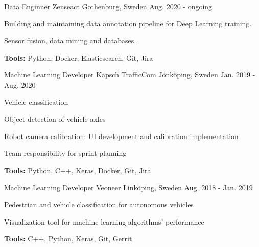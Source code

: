 

\begin{cventries}

  \cventry
    {Data Enginner} %
    {Zenseact} %
    {Gothenburg, Sweden} %
    {Aug. 2020 - ongoing} %
    {
      \begin{cvitems} %
        \item {Building and maintaining data annotation pipeline for Deep Learning training.}
        \item {Sensor fusion, data mining and databases.}
        \item {\textbf{Tools:} Python, Docker, Elasticsearch, Git, Jira}
      \end{cvitems}
    }

  \cventry
    {Machine Learning Developer} %
    {Kapsch TrafficCom} %
    {Jönköping, Sweden} %
    {Jan. 2019 - Aug. 2020} %
    {
      \begin{cvitems} %
        \item {Vehicle classification}
        \item {Object detection of vehicle axles}
        \item {Robot camera calibration: UI development and calibration implementation}
        \item {Team responsibility for sprint planning}
        \item {\textbf{Tools:} Python, C++, Keras, Docker, Git, Jira}
      \end{cvitems}
    }

  \cventry
    {Machine Learning Developer} %
    {Veoneer} %
    {Linköping, Sweden} %
    {Aug. 2018 - Jan. 2019} %
    {
      \begin{cvitems} %
        \item {Pedestrian and vehicle classification for autonomous vehicles}
        \item {Visualization tool for machine learning algorithms' performance}
        \item {\textbf{Tools:} C++, Python, Keras, Git, Gerrit}
      \end{cvitems}
    }


\end{cventries}
